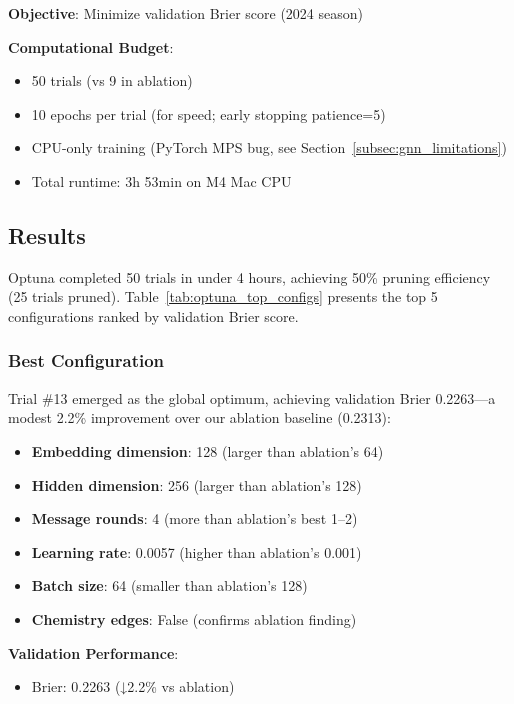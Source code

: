 \textbf{Objective}: Minimize validation Brier score (2024 season)

\textbf{Computational Budget}:
\begin{itemize}[noitemsep]
    \item 50 trials (vs 9 in ablation)
    \item 10 epochs per trial (for speed; early stopping patience=5)
    \item CPU-only training (PyTorch MPS bug, see Section~\ref{subsec:gnn_limitations})
    \item Total runtime: 3h 53min on M4 Mac CPU
\end{itemize}

\subsection{Results}
\label{subsec:optuna_results}

Optuna completed 50 trials in under 4 hours, achieving 50\% pruning efficiency (25 trials pruned). Table~\ref{tab:optuna_top_configs} presents the top 5 configurations ranked by validation Brier score.



\subsubsection{Best Configuration}

Trial \#13 emerged as the global optimum, achieving validation Brier 0.2263—a modest 2.2\% improvement over our ablation baseline (0.2313):

\begin{tcolorbox}[colback=blue!5!white, colframe=blue!75!black, title=Optuna Best Configuration (Trial \#13)]
\begin{itemize}[noitemsep]
    \item \textbf{Embedding dimension}: 128 (larger than ablation's 64)
    \item \textbf{Hidden dimension}: 256 (larger than ablation's 128)
    \item \textbf{Message rounds}: 4 (more than ablation's best 1--2)
    \item \textbf{Learning rate}: 0.0057 (higher than ablation's 0.001)
    \item \textbf{Batch size}: 64 (smaller than ablation's 128)
    \item \textbf{Chemistry edges}: False (confirms ablation finding)
\end{itemize}

\textbf{Validation Performance}:
\begin{itemize}[noitemsep]
    \item Brier: 0.2263 (↓2.2\% vs ablation)
\end{itemize}
\end{tcolorbox}

